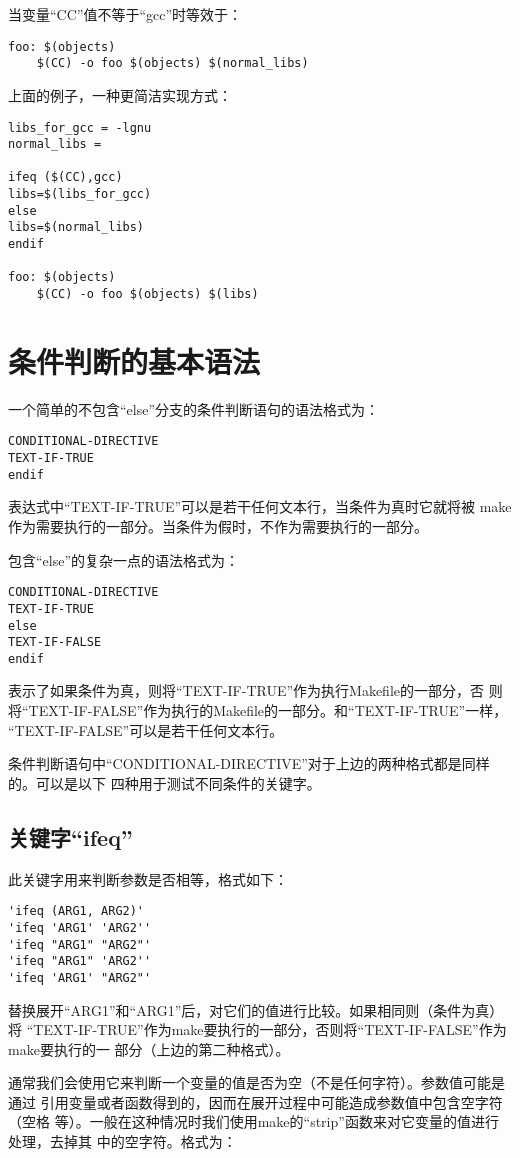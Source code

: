 当变量“CC”值不等于“gcc”时等效于：
\begin{Verbatim}[]
foo: $(objects)
    $(CC) -o foo $(objects) $(normal_libs)
\end{Verbatim}

上面的例子，一种更简洁实现方式：
\begin{Verbatim}[]
libs_for_gcc = -lgnu
normal_libs =

ifeq ($(CC),gcc)
libs=$(libs_for_gcc)
else
libs=$(normal_libs)
endif

foo: $(objects)
    $(CC) -o foo $(objects) $(libs)
\end{Verbatim}

\section{条件判断的基本语法}
一个简单的不包含“else”分支的条件判断语句的语法格式为：
\begin{Verbatim}[]
CONDITIONAL-DIRECTIVE
TEXT-IF-TRUE
endif
\end{Verbatim}
\noindent 表达式中“TEXT-IF-TRUE”可以是若干任何文本行，当条件为真时它就将被
make作为需要执行的一部分。当条件为假时，不作为需要执行的一部分。

包含“else”的复杂一点的语法格式为：
\begin{Verbatim}[]
CONDITIONAL-DIRECTIVE
TEXT-IF-TRUE
else
TEXT-IF-FALSE
endif
\end{Verbatim}
\noindent 表示了如果条件为真，则将“TEXT-IF-TRUE”作为执行Makefile的一部分，否
则将“TEXT-IF-FALSE”作为执行的Makefile的一部分。和“TEXT-IF-TRUE”一样，
“TEXT-IF-FALSE”可以是若干任何文本行。

条件判断语句中“CONDITIONAL-DIRECTIVE”对于上边的两种格式都是同样的。可以是以下
四种用于测试不同条件的关键字。

\subsection{关键字“ifeq”}
此关键字用来判断参数是否相等，格式如下：
\begin{Verbatim}[]
'ifeq (ARG1, ARG2)'
'ifeq 'ARG1' 'ARG2''
'ifeq "ARG1" "ARG2"'
'ifeq "ARG1" 'ARG2''
'ifeq 'ARG1' "ARG2"'
\end{Verbatim}

替换展开“ARG1”和“ARG1”后，对它们的值进行比较。如果相同则（条件为真）将
“TEXT-IF-TRUE”作为make要执行的一部分，否则将“TEXT-IF-FALSE”作为make要执行的一
部分（上边的第二种格式）。

通常我们会使用它来判断一个变量的值是否为空（不是任何字符）。参数值可能是通过
引用变量或者函数得到的，因而在展开过程中可能造成参数值中包含空字符（空格
等）。一般在这种情况时我们使用make的“strip”函数来对它变量的值进行处理，去掉其
中的空字符。格式为：

